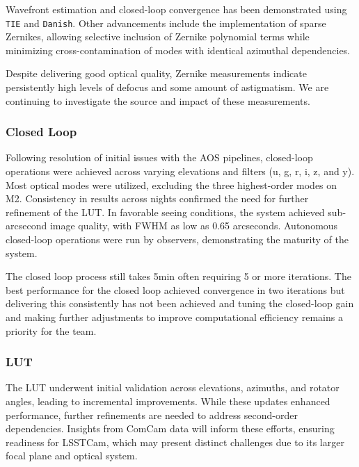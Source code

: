 Wavefront estimation and closed-loop convergence has been demonstrated using \texttt{TIE} and \texttt{Danish}. Other advancements include the implementation of sparse Zernikes,  allowing selective inclusion of Zernike polynomial terms while minimizing cross-contamination 
of modes with identical azimuthal dependencies.

Despite delivering good optical quality, Zernike measurements indicate persistently high levels of defocus and some amount of astigmatism. We are continuing to investigate the source and impact of these measurements.

\subsubsection{Closed Loop}
Following resolution of initial issues with the AOS pipelines,  closed-loop operations were achieved across varying elevations and filters (u, g, r, i, z, and y).  Most optical modes were utilized, excluding the three highest-order modes on M2.  Consistency in results across nights confirmed the need for further refinement of the LUT. In favorable seeing conditions, the system achieved sub-arcsecond image quality, with FWHM as low as 0.65 arcseconds. Autonomous closed-loop operations were run by observers, demonstrating the maturity of the system. 


The closed loop process still takes 5min  often requiring 5 or more iterations. The best performance for the closed loop achieved convergence in two iterations but delivering this consistently has not been achieved and tuning the closed-loop gain and making further adjustments to improve computational  efficiency remains a priority for the team.

\subsubsection{LUT}
The LUT underwent initial validation across elevations, azimuths, and rotator angles, 
leading to incremental improvements. While these updates enhanced performance, 
further refinements are needed to address second-order dependencies. Insights 
from ComCam data will inform these efforts, ensuring readiness for LSSTCam, which 
may present distinct challenges due to its larger focal plane and optical system.




